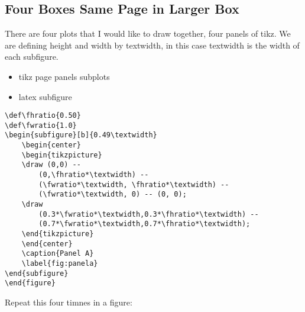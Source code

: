 \documentclass{article}
\begin{document}
\subsection{Four Boxes Same Page in Larger Box}
There are four plots that I would like to draw together, four panels of tikz. We are defining height and width by textwidth, in this case textwidth is the width of each subfigure.

\begin{itemize}
    \item tikz page panels subplots
    \item latex subfigure
\end{itemize}

\begin{verbatim}
\def\fhratio{0.50}
\def\fwratio{1.0}
\begin{subfigure}[b]{0.49\textwidth}
    \begin{center}
    \begin{tikzpicture}
    \draw (0,0) --
        (0,\fhratio*\textwidth) --
        (\fwratio*\textwidth, \fhratio*\textwidth) --
        (\fwratio*\textwidth, 0) -- (0, 0);
    \draw
        (0.3*\fwratio*\textwidth,0.3*\fhratio*\textwidth) --
        (0.7*\fwratio*\textwidth,0.7*\fhratio*\textwidth);
    \end{tikzpicture}
    \end{center}
    \caption{Panel A}
    \label{fig:panela}
\end{subfigure}
\end{figure}
\end{verbatim}
Repeat this four timnes in a figure:
\def\fhratio{0.50}
\def\fwratio{1.0}
\end{document}
